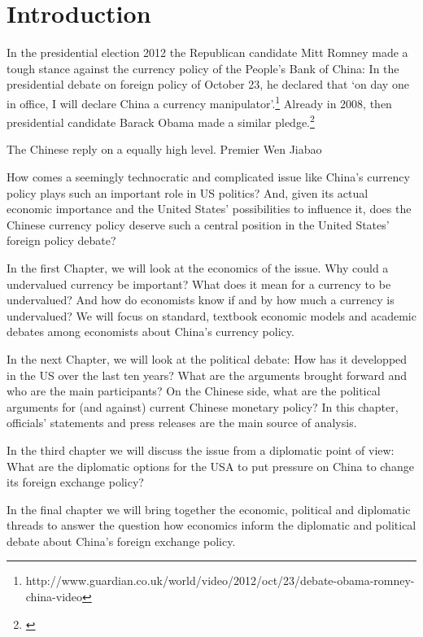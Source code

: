 \section{Introduction}

In the presidential election 2012 the Republican candidate Mitt Romney made a tough stance against the currency policy of the People's Bank of China: In the presidential debate on foreign policy of October 23, he declared that `on day one in office, I will declare China a currency manipulator'.\footnote{http://www.guardian.co.uk/world/video/2012/oct/23/debate-obama-romney-china-video}%
Already in 2008, then presidential candidate Barack Obama made a similar pledge.\footnote{\cite{Obama2008}}

The Chinese reply on a equally high level. Premier Wen Jiabao

How comes a seemingly technocratic and complicated issue like China's currency policy plays such an important role in US politics? And, given its actual economic importance and the United States' possibilities to influence it, does the Chinese currency policy deserve such a central position in the United States' foreign policy debate? %

In the first Chapter, we will look at the economics of the issue. Why could a undervalued currency be important? What does it mean for a currency to be undervalued? And how do economists know if and by how much a currency is undervalued? We will focus on standard, textbook economic models and academic debates among economists about China's currency policy. 

In the next Chapter, we will look at the political debate: How has it developped in the US over the last ten years? What are the arguments brought forward and who are the main participants? On the Chinese side, what are the political arguments for (and against) current Chinese monetary policy? In this chapter, officials' statements and press releases are the main source of analysis. %

In the third chapter we will discuss the issue from a diplomatic point of view: What are the diplomatic options for the USA to put pressure on China to change its foreign exchange policy? %

In the final chapter we will bring together the economic, political and diplomatic threads to answer the question how economics inform the diplomatic and political debate about China's foreign exchange policy.



